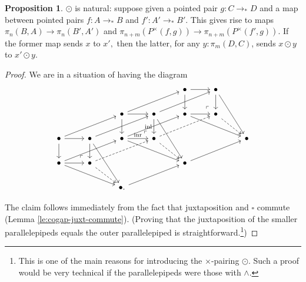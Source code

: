 \documentclass{amsart}
\theoremstyle{definition}
\newtheorem{prp}[theorem]{Proposition}
\newcommand{\inl}{\operatorname{inl}}
\newcommand{\inr}{\operatorname{inr}}
\newcommand{\pto}{\to_*}
\begin{document}
\begin{prp}\label{odot-prod-nat}
    $\odot$ is natural: suppose given a pointed pair $g: C \pto D$ and a map between pointed pairs $f: A \pto B$ and $f': A' \pto B'$. This gives rise to maps $\pi_n(B,A) \to \pi_n(B',A')$ and
    $\pi_{n+m}(P^{\times}(f,g)) \to \pi_{n+m}(P^{\times}(f',g))$. If the former map sends $x$ to $x',$ then the latter, for any $y : \pi_m(D,C)$, sends $x \odot y$ to $x' \odot y$.
\end{prp}
\begin{proof}
    We are in a situation of having the diagram
    \[\begin{tikzcd}
    	&&&& \bullet & \bullet \\
    	&& \bullet & \bullet & \bullet & \bullet \\
    	\bullet & \bullet & \bullet & \bullet &&& \bullet \\
    	\bullet & \bullet &&& \bullet \\
    	&& {\bullet.}
    	\arrow[from=1-5, to=1-6]
    	\arrow[from=1-5, to=2-5]
    	\arrow[from=1-6, to=2-6]
    	\arrow[from=1-6, to=3-7]
    	\arrow[from=2-3, to=1-5]
    	\arrow[from=2-3, to=2-4]
    	\arrow[from=2-3, to=3-3]
    	\arrow[from=2-4, to=1-6]
    	\arrow["\inl"', from=2-4, to=3-4]
    	\arrow[from=2-4, to=4-5]
    	\arrow[from=2-5, to=2-6]
    	\arrow[from=2-5, to=3-7]
    	\arrow["\lrcorner"{anchor=center, pos=0.125, rotate=180}, draw=none, from=2-6, to=1-5]
    	\arrow[dashed, from=2-6, to=3-7]
    	\arrow[from=3-1, to=2-3]
    	\arrow[from=3-1, to=3-2]
    	\arrow[from=3-1, to=4-1]
    	\arrow[from=3-2, to=2-4]
    	\arrow[from=3-2, to=4-2]
    	\arrow[from=3-2, to=5-3]
    	\arrow[from=3-3, to=2-5]
    	\arrow["\inr", from=3-3, to=3-4]
    	\arrow[from=3-3, to=4-5]
    	\arrow["\lrcorner"{anchor=center, pos=0.125, rotate=180}, draw=none, from=3-4, to=2-3]
    	\arrow[dashed, from=3-4, to=2-6]
    	\arrow[dashed, from=3-4, to=4-5]
    	\arrow[from=4-1, to=3-3]
    	\arrow[from=4-1, to=4-2]
    	\arrow[from=4-1, to=5-3]
    	\arrow["\lrcorner"{anchor=center, pos=0.125, rotate=180}, draw=none, from=4-2, to=3-1]
    	\arrow[dashed, from=4-2, to=3-4]
    	\arrow[dashed, from=4-2, to=5-3]
    	\arrow[from=4-5, to=3-7]
    	\arrow[from=5-3, to=4-5]
    \end{tikzcd}\]

The claim follows immediately from the fact that juxtaposition and $\square$ commute (Lemma \ref{le:cogap-juxt-commute}). (Proving that the juxtaposition of the smaller parallelepipeds equals the outer parallelepiped is straightforward.\footnote{This is one of the main reasons for introducing the $\times$-pairing $\odot$. Such a proof would be very technical if the parallelepipeds were those with $\wedge$.})
\end{proof}
\end{document}
